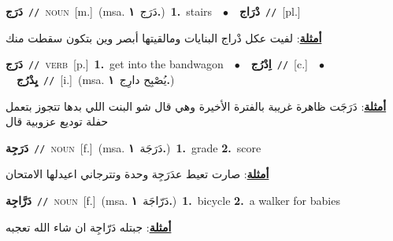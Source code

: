 \documentclass[10pt,a4paper,twoside]{article} %
\begin{document}
\begin{multicols}{2}
{\setlength\topsep{0pt}\textbf{\foreignlanguage{arabic}{دَرَج}}\ {\color{gray}\texttt{//}\color{black}}\ \textsc{noun}\ [m.]\ \color{gray}(msa. \foreignlanguage{arabic}{دَرَج}~\foreignlanguage{arabic}{\textbf{١.}})\color{black}\ \textbf{1.}~stairs\ \ $\bullet$\ \ \setlength\topsep{0pt}\textbf{\foreignlanguage{arabic}{دْرَاج}}\ {\color{gray}\texttt{//}\color{black}}\ [pl.]\  \begin{flushright}\color{gray}\foreignlanguage{arabic}{\textbf{\underline{\foreignlanguage{arabic}{أمثلة}}}: لفيت عكل دْراج البنايات ومالقيتها أبصر وين بتكون سقطت منك}\end{flushright}\color{black}} \vspace{2mm}

{\setlength\topsep{0pt}\textbf{\foreignlanguage{arabic}{دَرَج}}\ {\color{gray}\texttt{//}\color{black}}\ \textsc{verb}\ [p.]\ \textbf{1.}~get into the bandwagon\ \ $\bullet$\ \ \setlength\topsep{0pt}\textbf{\foreignlanguage{arabic}{اِدْرُج}}\ {\color{gray}\texttt{//}\color{black}}\ [c.]\ \ $\bullet$\ \ \setlength\topsep{0pt}\textbf{\foreignlanguage{arabic}{يِدْرُج}}\ {\color{gray}\texttt{//}\color{black}}\ [i.]\ \color{gray}(msa. \foreignlanguage{arabic}{يُصْبِح دارِج}~\foreignlanguage{arabic}{\textbf{١.}})\color{black}\  \begin{flushright}\color{gray}\foreignlanguage{arabic}{\textbf{\underline{\foreignlanguage{arabic}{أمثلة}}}: دَرَجَت ظاهرة غريبة بالفترة الأخيرة وهي قال شو البنت اللي بدها تتجوز بتعمل حفلة توديع عزوبية قال}\end{flushright}\color{black}} \vspace{2mm}

{\setlength\topsep{0pt}\textbf{\foreignlanguage{arabic}{دَرَجِة}}\ {\color{gray}\texttt{//}\color{black}}\ \textsc{noun}\ [f.]\ \color{gray}(msa. \foreignlanguage{arabic}{دَرَجَة}~\foreignlanguage{arabic}{\textbf{١.}})\color{black}\ \textbf{1.}~grade  \textbf{2.}~score\  \begin{flushright}\color{gray}\foreignlanguage{arabic}{\textbf{\underline{\foreignlanguage{arabic}{أمثلة}}}: صارت تعيط عدَرَجِة وحدة وتترجاني اعيدلها الامتحان}\end{flushright}\color{black}} \vspace{2mm}

{\setlength\topsep{0pt}\textbf{\foreignlanguage{arabic}{دَرَّاجِة}}\ {\color{gray}\texttt{//}\color{black}}\ \textsc{noun}\ [f.]\ \color{gray}(msa. \foreignlanguage{arabic}{دَرّاجَة}~\foreignlanguage{arabic}{\textbf{١.}})\color{black}\ \textbf{1.}~bicycle  \textbf{2.}~a walker for babies\  \begin{flushright}\color{gray}\foreignlanguage{arabic}{\textbf{\underline{\foreignlanguage{arabic}{أمثلة}}}: جبتله دَرّاجِة ان شاء الله تعجبه}\end{flushright}\color{black}} \vspace{2mm}


\end{multicols}
\end{document}
